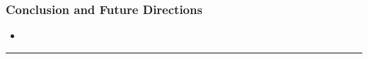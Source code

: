 \begin{frame}
\frametitle{Conclusion and Future Directions}
\vspace{1.5mm}

\begin{block}{}
    
\end{block}

{\small

\begin{itemize}
    \item 
\end{itemize}}

\hrule 

\begin{block}{}
    
\end{block}




\end{frame}